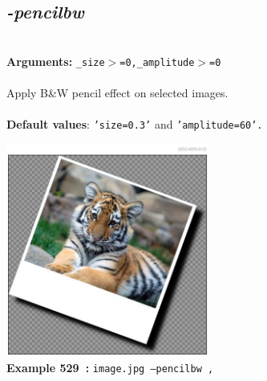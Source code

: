 \documentclass[a4paper,11pt,twoside]{book}
\begin{document}
\subsection{\emph{-pencilbw} }\vspace*{-0.5em}
~\\\textbf{Arguments: } 
{\small \texttt{\_size$>$=0,\_amplitude$>$=0}}\\~\\
Apply B\&W pencil effect on selected images.
~\\~\\\textbf{Default values}: {\small \texttt{'size=0.3'} and \texttt{'amplitude=60'.}}
\begin{center}\includegraphics[keepaspectratio=true,height=7cm,width=\textwidth]{img/gmic_def529.jpg}\\
{\footnotesize \textbf{Example 529~:} \texttt{image.jpg --pencilbw ,}}
\end{center}
\end{document}

